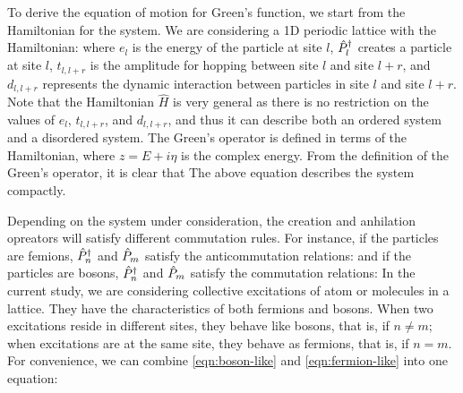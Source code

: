 To derive the equation of motion for Green's function, we start from the Hamiltonian for the system. We are 
considering a 1D periodic lattice with the Hamiltonian:
where $e_l$ is the energy of the particle at site $l$, $\hat{P}^{\dagger}_{l}$ creates a particle at site $l$, $t_{l, l+r}$ is the amplitude 
for hopping  between
site $l$ and site $l+r$, and $d_{l, l+r}$ represents the dynamic interaction between particles in 
site $l$ and site $l+r$. Note that the Hamiltonian $\hat{H}$ is very general as there is no restriction on the values 
of $e_l$, $t_{l, l+r}$, and $d_{l, l+r}$, and thus it can describe both an ordered system and a 
disordered system. The Green's operator is defined in terms of the Hamiltonian,
where $z = E + i\eta$ is the complex energy. From the definition of the Green's operator, it is clear that  
The above equation  describes the system compactly. 

Depending on the system under consideration, the creation and anhilation opreators will satisfy different commutation
rules. For instance, if the particles are femions, $\hat{P}^{\dagger}_{n}$ and $\hat{P}_{m}$ satisfy the anticommutation relations:
and if the particles are bosons, $\hat{P}^{\dagger}_{n}$ and $\hat{P}_{m}$ satisfy the commutation relations:
In the current study, we are considering collective excitations of atom or molecules in a lattice. They have the 
characteristics of both fermions and bosons. When two excitations reside in different sites, they behave like
bosons, that is,
if $n \neq m$; when excitations are at the same site, they behave as fermions, that is,
if $n = m$. For convenience, we can combine \autoref{eqn:boson-like} and \autoref{eqn:fermion-like} into one equation:

